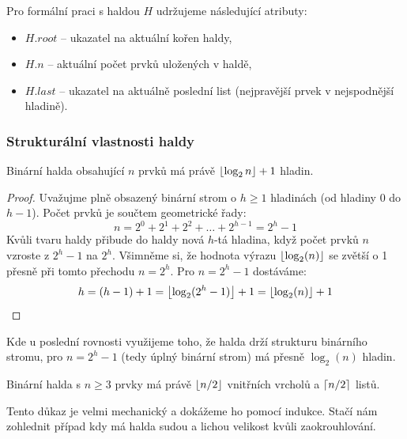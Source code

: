\bigskip

\begin{remark}
Pro formální praci s haldou $H$ udržujeme následující atributy:
\begin{itemize}
    \item $H.root$ -- ukazatel na aktuální kořen haldy,
    \item $H.n$ -- aktuální počet prvků uložených v haldě,
    \item $H.last$ -- ukazatel na aktuálně poslední list (nejpravější prvek v nejspodnější hladině).
\end{itemize}
\end{remark} \bigskip

\subsubsection{Strukturální vlastnosti haldy}

\begin{lemma}
Binární halda obsahující $n$ prvků má právě $\left\lfloor\log_2 n\right\rfloor + 1$ hladin.
\end{lemma} \bigskip

\begin{proof}
\leavevmode
Uvažujme plně obsazený binární strom o $h \ge 1$ hladinách (od hladiny $0$ do $h - 1$). Počet prvků je součtem geometrické řady:
$$n = 2^0 + 2^1 + 2^2 + \dots + 2^{h-1} = 2^h - 1$$
Kvůli tvaru haldy přibude do haldy nová $h$-tá hladina, když počet prvků $n$ vzroste z $2^h - 1$ na $2^h$. Všimněme si, že hodnota výrazu $\left\lfloor\log_2 (n)\right\rfloor$ se zvětší o 1 přesně při tomto přechodu $n = 2^h$.
Pro $n = 2^h - 1$ dostáváme:
$$h = (h - 1) + 1 = \left\lfloor\log_2(2^h - 1)\right\rfloor + 1 = \left\lfloor\log_2 (n)\right\rfloor + 1$$
\end{proof} \medskip


\noindent Kde u poslední rovnosti využijeme toho, že halda drží strukturu binárního stromu, pro $n = 2^h - 1$ (tedy úplný binární strom) má přesně $\log_2 (n)$ hladin.
\bigskip

\begin{lemma}
Binární halda s $n \ge 3$ prvky má právě $\left\lfloor n/2\right\rfloor$ vnitřních vrcholů a $\left\lceil n/2\right\rceil$ listů.
\end{lemma} \bigskip

\noindent Tento důkaz je velmi mechanický a dokážeme ho pomocí indukce. Stačí nám zohlednit případ kdy má halda sudou a lichou velikost kvůli zaokrouhlování.

